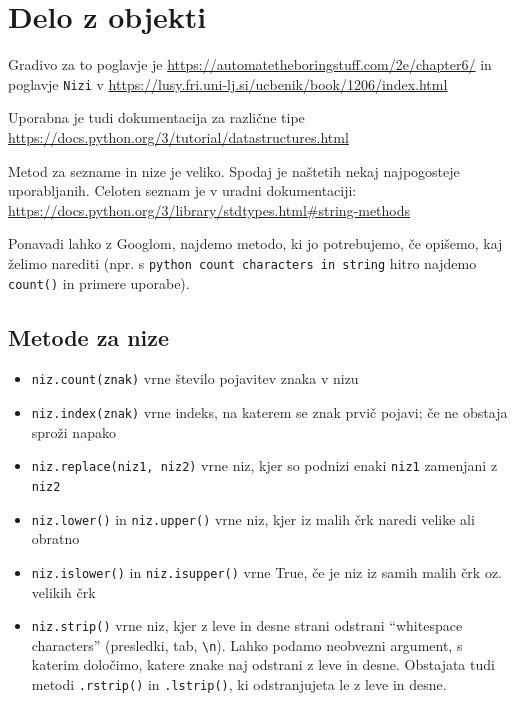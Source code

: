 \documentclass[
]{book}
\providecommand{\tightlist}{%
  \setlength{\itemsep}{0pt}\setlength{\parskip}{0pt}}
\begin{document}
\hypertarget{delo-z-objekti}{%
\chapter{Delo z objekti}\label{delo-z-objekti}}

Gradivo za to poglavje je \url{https://automatetheboringstuff.com/2e/chapter6/}
in poglavje \texttt{Nizi} v \url{https://lusy.fri.uni-lj.si/ucbenik/book/1206/index.html}

Uporabna je tudi dokumentacija za različne tipe \url{https://docs.python.org/3/tutorial/datastructures.html}

Metod za sezname in nize je veliko. Spodaj je naštetih nekaj najpogosteje uporabljanih. Celoten seznam je v uradni dokumentaciji: \url{https://docs.python.org/3/library/stdtypes.html\#string-methods}

Ponavadi lahko z Googlom, najdemo metodo, ki jo potrebujemo, če opišemo, kaj želimo
narediti (npr. s \texttt{python\ count\ characters\ in\ string} hitro najdemo \texttt{count()} in primere uporabe).

\hypertarget{metode-za-nize}{%
\section{Metode za nize}\label{metode-za-nize}}

\begin{itemize}
\tightlist
\item
  \texttt{niz.count(znak)} vrne število pojavitev znaka v nizu
\item
  \texttt{niz.index(znak)} vrne indeks, na katerem se znak prvič pojavi; če ne obstaja sproži napako
\item
  \texttt{niz.replace(niz1,\ niz2)} vrne niz, kjer so podnizi enaki \texttt{niz1} zamenjani z \texttt{niz2}
\item
  \texttt{niz.lower()} in \texttt{niz.upper()} vrne niz, kjer iz malih črk naredi velike ali obratno
\item
  \texttt{niz.islower()} in \texttt{niz.isupper()} vrne True, če je niz iz samih malih črk oz. velikih črk
\item
  \texttt{niz.strip()} vrne niz, kjer z leve in desne strani odstrani ``whitespace characters'' (presledki, tab, \texttt{\textbackslash{}n}). Lahko podamo neobvezni argument, s katerim določimo, katere znake
  naj odstrani z leve in desne. Obstajata tudi metodi \texttt{.rstrip()} in \texttt{.lstrip()}, ki odstranjujeta le z leve in desne.
\end{itemize}
\end{document}

